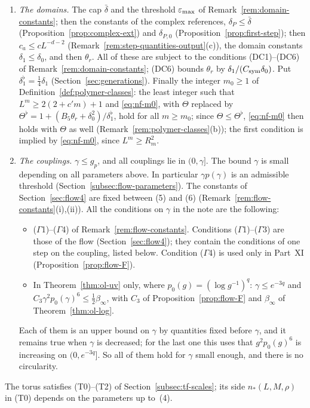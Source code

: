 \begin{remark}[Parameters]
\begin{enumerate}[label=(\arabic*)]
\item \emph{The domains.} The cap $\bar\delta$ and the threshold $\varepsilon_{\max}$ of Remark~\ref{rem:domain-constants}; then the constants of the complex references, $\delta_P\le\bar\delta$ (Proposition~\ref{prop:complex-ext}) and $\delta_{P,0}$ (Proposition~\ref{prop:first-step}); then $c_a\le cL^{-d-2}$ (Remark~\ref{rem:step-quantities-output}(c)), the domain constants $\delta_1\le\delta_0$, and then $\theta_r$. All of these are subject to the conditions (DC1)--(DC6) of Remark~\ref{rem:domain-constants}; (DC6) bounds $\theta_r$ by $\delta_1/(C_{\rm sym}\delta_0)$. Put $\delta_1^\flat=\frac14\delta_1$ (Section~\ref{sec:generations}). Finally the integer $m_0\ge1$ of Definition~\ref{def:polymer-classes}: the least integer such that $L^m\ge2(2+c'm)+1$ and \eqref{eq:nf-m0}, with $\Theta$ replaced by $\Theta^\flat=1+(B_5\theta_r+\delta_0^2)/\delta_1^\flat$, hold for all $m\ge m_0$; since $\Theta\le\Theta^\flat$, \eqref{eq:nf-m0} then holds with $\Theta$ as well (Remark~\ref{rem:polymer-classes}(b)); the first condition is implied by \eqref{eq:nf-m0}, since $L^m\ge R_m^2$.
\item \emph{The couplings.} $\gamma\le g_p$, and all couplings lie in $(0,\gamma]$. The bound $\gamma$ is small depending on all parameters above. In particular $\gamma p(\gamma)$ is an admissible threshold (Section~\ref{subsec:flow-parameters}). The constants of Section~\ref{sec:flow4} are fixed between (5) and (6) (Remark~\ref{rem:flow-constants}(i),(ii)). All the conditions on $\gamma$ in the note are the following:
\begin{itemize}
\item ($\Gamma$1)--($\Gamma$4) of Remark~\ref{rem:flow-constants}. Conditions ($\Gamma$1)--($\Gamma$3) are those of the flow (Section~\ref{sec:flow4}); they contain the conditions of one step on the coupling, listed below. Condition ($\Gamma$4) is used only in Part~XI (Proposition~\ref{prop:flow-F}).
\item In Theorem~\ref{thm:ol-uv} only, where $p_0(g)=(\log g^{-1})^q$: $\gamma\le e^{-3q}$ and $C_3\gamma^2p_0(\gamma)^6\le\frac12\beta_\infty$, with $C_3$ of Proposition~\ref{prop:flow-F} and $\beta_\infty$ of Theorem~\ref{thm:ol-log}.
\end{itemize}
Each of them is an upper bound on $\gamma$ by quantities fixed before $\gamma$, and it remains true when $\gamma$ is decreased; for the last one this uses that $g^2p_0(g)^6$ is increasing on $(0,e^{-3q}]$. So all of them hold for $\gamma$ small enough, and there is no circularity.
\end{enumerate}
The torus satisfies (T0)--(T2) of Section~\ref{subsec:tf-scales}; its side $n_*(L,M,\rho)$ in (T0) depends on the parameters up to~(4).


\end{remark}
